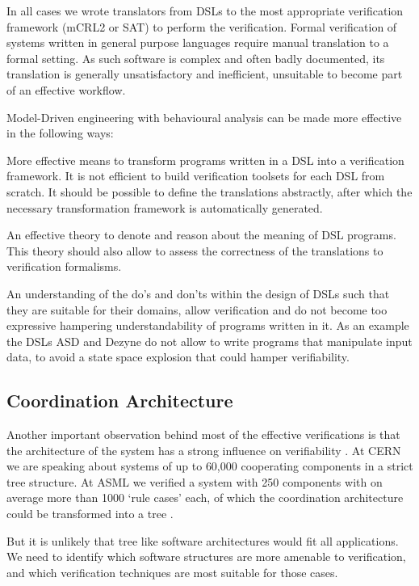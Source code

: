 \documentclass[sigplan,10pt,review]{acmart}\settopmatter{printfolios=true,printccs=false,printacmref=false}
\begin{document}
In all cases we wrote translators from DSLs to the most appropriate verification framework
(mCRL2 \cite{DBLP:books/mit/GrooteM2014} or SAT) to perform the verification. Formal verification of systems written in general 
purpose languages require manual translation to a formal setting. As such software
is complex and often badly documented, its translation is generally unsatisfactory and inefficient,
unsuitable to become part of an effective workflow. 

Model-Driven engineering with behavioural analysis can be made more effective in the following ways:
\begin{compactitem}
\item 
More effective means to transform programs written in a DSL into a verification framework.
It is not efficient to build verification toolsets for each DSL from scratch. 
It should be possible to define the translations abstractly, after which the necessary 
transformation framework is automatically generated.
\item 
An effective theory to denote and reason about the meaning of DSL programs. This theory should
also allow to assess the correctness of the translations to verification formalisms. 

\item 
An understanding of the do's and don'ts within the design of DSLs such that they are suitable for their domains,
allow verification and do not become too expressive hampering understandability of programs written in it. 
As an example the DSLs ASD and Dezyne do not allow to write
programs that manipulate input data, to avoid a state space explosion that could hamper verifiability. 

\end{compactitem}

\subsection{Coordination Architecture}
Another important observation behind most of the effective verifications is that
the architecture of the system has a strong influence
on verifiability \cite{GrooteKoutersOsaiweran}. At CERN we are speaking about systems of up to 60,000 cooperating components
in a strict tree structure. At ASML we verified a system with 250 components with on average more than
1000 `rule cases' each, of which the coordination architecture
could be transformed into a tree \cite{Jonk16}. 

But it is unlikely that tree like software architectures would fit all applications. We need to identify
which software structures are more amenable to verification, and which verification techniques are most
suitable for those cases.
\end{document}
